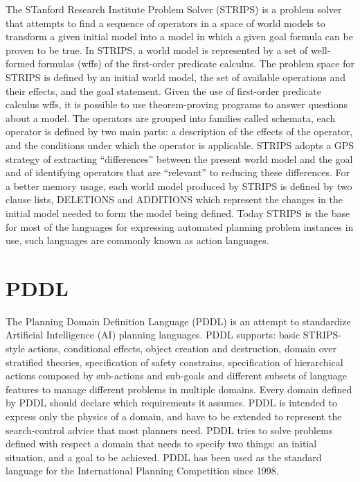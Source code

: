 \documentclass[10pt,a4paper]{article}
\begin{document}
The STanford Research Institute Problem Solver (STRIPS) \cite{STRIPS} is a problem solver that attempts to find a sequence of operators in a space of world models to transform a given initial model into a model in which a given goal formula can be proven to be true. In STRIPS, a world model is represented by a set of well-formed formulas (wffs) of the first-order predicate calculus. The problem space for STRIPS is defined by an initial world model, the set of available operations and their effects, and the goal statement. Given the use of first-order predicate calculus wffs, it is possible to use theorem-proving programs to answer questions about a model. The  operators are grouped into families called schemata, each operator is defined by two main parts: a description of the effects of the operator, and the conditions under which the operator is applicable. STRIPS adopts a GPS strategy of extracting ``differences'' between the present world model and the goal and of identifying operators that are ``relevant'' to reducing these differences. For a better memory usage, each world model produced by STRIPS is defined by two clause lists, DELETIONS and ADDITIONS which represent the changes in the initial model needed to form the model being defined. Today STRIPS is the base for most of the languages for expressing automated planning problem instances in use, such languages are commonly known as action languages.

\section{PDDL}

The Planning Domain Definition Language (PDDL) \cite{PDDL} is an attempt to standardize Artificial Intelligence (AI) planning languages. PDDL supports: basic STRIPS-style actions, conditional effects, object creation and destruction, domain over stratified theories,  specification of safety constrains, specification of hierarchical actions composed by sub-actions and sub-goals and different subsets of language features to manage different problems in multiple domains. Every domain defined by PDDL should declare which requirements it assumes. PDDL is intended to express only the physics of a domain, and have to be extended to represent the search-control advice that most planners need. PDDL tries to solve problems defined with respect a domain that needs to specify two things: an initial situation, and a goal to be achieved. PDDL has been used as the standard language for the International Planning Competition since 1998.



\end{document}
